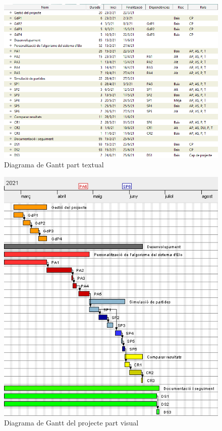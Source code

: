 \documentclass[a4paper]{article}
\begin{document}
\begin{figure}[H]
    \centering
    \includegraphics[width=1.15\textwidth]{images/GantEloEscrit.png}
    \caption{Diagrama de Gantt part textual}
    \label{fig:GanttText}
\end{figure}
 \newpage
\begin{landscape}

\newpage
\thispagestyle{lndscape}
    \begin{center}
        \begin{figure}[h!]
            \includegraphics[width=0.8
            \textwidth]{images/GantElo.png}%
            \caption{Diagrama de Gantt del projecte part visual}
            \label{fig:GanttElo}
        \end{figure}
    \end{center}
\end{landscape}
\end{document}
